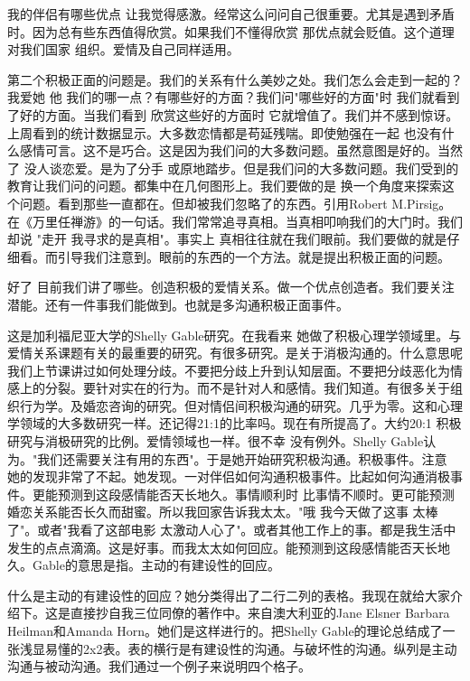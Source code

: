 我的伴侣有哪些优点 让我觉得感激。经常这么问问自己很重要。尤其是遇到矛盾时。因为总有些东西值得欣赏。如果我们不懂得欣赏 那优点就会贬值。这个道理对我们国家 组织。爱情及自己同样适用。 

第二个积极正面的问题是。我们的关系有什么美妙之处。我们怎么会走到一起的？我爱她 他 我们的哪一点？有哪些好的方面？我们问"哪些好的方面"时 我们就看到了好的方面。当我们看到 欣赏这些好的方面时 它就增值了。我们并不感到惊讶。上周看到的统计数据显示。大多数恋情都是苟延残喘。即使勉强在一起 也没有什么感情可言。这不是巧合。这是因为我们问的大多数问题。虽然意图是好的。当然了 没人谈恋爱。是为了分手 或原地踏步。但是我们问的大多数问题。我们受到的教育让我们问的问题。都集中在几何图形上。我们要做的是 换一个角度来探索这个问题。看到那些一直都在。但却被我们忽略了的东西。引用Robert M.Pirsig。在《万里任禅游》的一句话。我们常常追寻真相。当真相叩响我们的大门时。我们却说 "走开 我寻求的是真相"。事实上 真相往往就在我们眼前。我们要做的就是仔细看。而引导我们注意到。眼前的东西的一个方法。就是提出积极正面的问题。 

好了 目前我们讲了哪些。创造积极的爱情关系。做一个优点创造者。我们要关注潜能。还有一件事我们能做到。也就是多沟通积极正面事件。 

这是加利福尼亚大学的Shelly Gable研究。在我看来 她做了积极心理学领域里。与爱情关系课题有关的最重要的研究。有很多研究。是关于消极沟通的。什么意思呢 我们上节课讲过如何处理分歧。不要把分歧上升到认知层面。不要把分歧恶化为情感上的分裂。要针对实在的行为。而不是针对人和感情。我们知道。有很多关于组织行为学。及婚恋咨询的研究。但对情侣间积极沟通的研究。几乎为零。这和心理学领域的大多数研究一样。还记得21:1的比率吗。现在有所提高了。大约20:1 积极研究与消极研究的比例。爱情领域也一样。很不幸 没有例外。Shelly Gable认为。"我们还需要关注有用的东西"。于是她开始研究积极沟通。积极事件。注意 她的发现非常了不起。她发现。一对伴侣如何沟通积极事件。比起如何沟通消极事件。更能预测到这段感情能否天长地久。事情顺利时 比事情不顺时。更可能预测婚恋关系能否长久而甜蜜。所以我回家告诉我太太。"哦 我今天做了这事 太棒了"。或者"我看了这部电影 太激动人心了"。或者其他工作上的事。都是我生活中发生的点点滴滴。这是好事。而我太太如何回应。能预测到这段感情能否天长地久。Gable的意思是指。主动的有建设性的回应。 

什么是主动的有建设性的回应？她分类得出了二行二列的表格。我现在就给大家介绍下。这是直接抄自我三位同僚的著作中。来自澳大利亚的Jane Elsner Barbara Heilman和Amanda Horn。她们是这样进行的。把Shelly Gable的理论总结成了一张浅显易懂的2x2表。表的横行是有建设性的沟通。与破坏性的沟通。纵列是主动沟通与被动沟通。我们通过一个例子来说明四个格子。 

